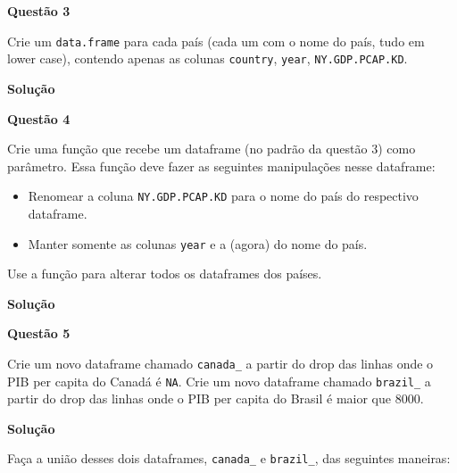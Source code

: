 \documentclass[12pt, a4paper]{article}
\begin{document}
\textbf{Questão 3}

Crie um \texttt{data.frame} para cada país (cada um com o nome do país, tudo em lower case), contendo apenas as colunas \texttt{country}, \texttt{year}, \texttt{NY.GDP.PCAP.KD}.



\textbf{Solução}





\textbf{Questão 4}

Crie uma função que recebe um dataframe (no padrão da questão 3) como parâmetro. Essa função deve fazer as seguintes manipulações nesse dataframe:

\begin{itemize}
	\item Renomear a coluna \texttt{NY.GDP.PCAP.KD} para o nome do país do respectivo dataframe.
	\item Manter somente as colunas \texttt{year} e a (agora) do nome do país.
\end{itemize}

Use a função para alterar todos os dataframes dos países.



\textbf{Solução}





\textbf{Questão 5}

Crie um novo dataframe chamado \texttt{canada\_} a partir do drop das linhas onde o PIB per capita do Canadá é \texttt{NA}. Crie um novo dataframe chamado \texttt{brazil\_} a partir do drop das linhas onde o PIB per capita do Brasil é maior que 8000.


\textbf{Solução}





Faça a união desses dois dataframes, \texttt{canada\_} e \texttt{brazil\_}, das seguintes maneiras:
\end{document}

